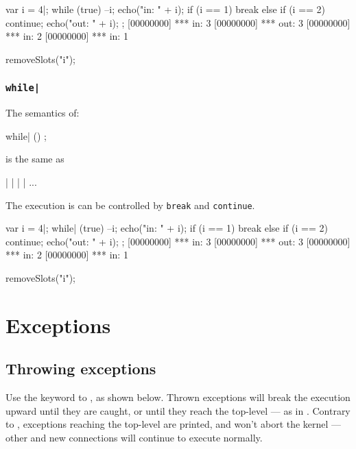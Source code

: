 \begin{urbiscript}
var i = 4|;
while (true)
{
  --i;
  echo("in: " + i);
  if (i == 1)
    break
  else if (i == 2)
    continue;
  echo("out: " + i);
};
[00000000] *** in: 3
[00000000] *** out: 3
[00000000] *** in: 2
[00000000] *** in: 1
\end{urbiscript}
\begin{urbicomment}
removeSlots("i");
\end{urbicomment}


\subsubsection{\lstinline{while|}}
\label{sec:lang:while:pipe}

The semantics of:

\begin{urbiunchecked}
while| ()
  ;
\end{urbiunchecked}

\noindent
is the same as

\begin{urbiunchecked}
 |  |  |  | ...
\end{urbiunchecked}

The execution is can be controlled by \lstinline{break} and
\lstinline{continue}.

\begin{urbiscript}
var i = 4|;
while| (true)
{
  --i;
  echo("in: " + i);
  if (i == 1)
    break
  else if (i == 2)
    continue;
  echo("out: " + i);
};
[00000000] *** in: 3
[00000000] *** out: 3
[00000000] *** in: 2
[00000000] *** in: 1
\end{urbiscript}
\begin{urbicomment}
removeSlots("i");
\end{urbicomment}


\section{Exceptions}
\label{sec:lang:except}
\subsection{Throwing exceptions}
\label{sec:lang:throw}

Use the  keyword to , as shown below. Thrown exceptions will break the execution
upward until they are caught, or until they reach the top-level --- as in
\Cxx.  Contrary to \Cxx, exceptions reaching the top-level are printed, and
won't abort the kernel --- other and new connections will continue to
execute normally.

